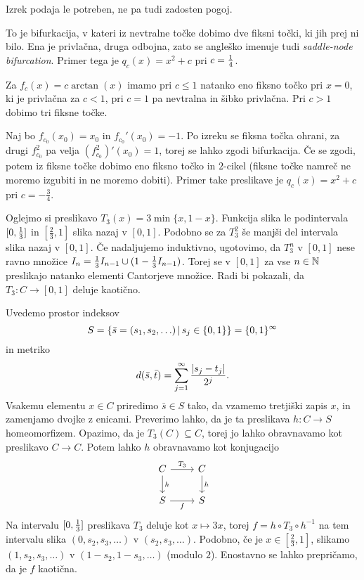 \begin{opomba}
  Izrek podaja le potreben, ne pa tudi zadosten pogoj.
\end{opomba}

\begin{primer}
  To je bifurkacija, v kateri iz nevtralne točke dobimo dve fiksni točki, ki jih
  prej ni bilo.
  Ena je privlačna, druga odbojna, zato se angleško imenuje tudi
  \textit{saddle-node bifurcation}.
  Primer tega je $q_c(x) = x^2 + c$ pri $c = \frac{1}{4}$.
\end{primer}

\begin{primer}
  Za $f_c(x) = c \arctan(x)$ imamo pri $c \le 1$ natanko eno fiksno točko pri $x
  = 0$, ki je privlačna za $c < 1$, pri $c = 1$ pa nevtralna in šibko privlačna.
  Pri $c > 1$ dobimo tri fiksne točke.
\end{primer}

\begin{primer}
  Naj bo $f_{c_0}(x_0) = x_0$ in $f_{c_0}'(x_0) = -1$.
  Po izreku se fiksna točka ohrani, za drugi $f_{c_0}^2$ pa velja
  $(f_{c_0}^2)'(x_0) = 1$, torej se lahko zgodi bifurkacija.
  Če se zgodi, potem iz fiksne točke dobimo eno fiksno točko in $2$-cikel
  (fiksne točke namreč ne moremo izgubiti in ne moremo dobiti).
  Primer take preslikave je $q_c(x) = x^2 + c$ pri $c = -\frac{3}{4}$.
\end{primer}


Oglejmo si preslikavo $T_3(x) = 3 \min \{x, 1-x\}$.
Funkcija slika le podintervala $[0, \frac{1}{3}]$ in $[\frac{2}{3}, 1]$ slika nazaj
v $[0,1]$.
Podobno se za $T_3^2$ še manjši del intervala slika nazaj v $[0,1]$.
Če nadaljujemo induktivno, ugotovimo, da $T_3^n$ v $[0,1]$ nese ravno množice
$I_n = \frac{1}{3} I_{n-1} \cup (1 - \frac{1}{3} I_{n-1})$.
Torej se v $[0,1]$ za vse $n \in \mathbb{N}$ preslikajo natanko elementi Cantorjeve
množice.
Radi bi pokazali, da $T_3: C \to [0,1]$ deluje kaotično.

Uvedemo prostor indeksov
\[
  S = \{ \bar{s} = (s_1, s_2, \ldots) \,|\, s_j \in \{0,1\} \} = \{0,1\}^\infty
\]
in metriko
\[
  d(\bar{s}, \bar{t}) = \sum_{j=1}^\infty \frac{\left| s_j - t_j \right|}{2^j}.
\]
Vsakemu elementu $x \in C$ priredimo $\bar{s} \in S$ tako, da vzamemo tretjiški
zapis $x$, in zamenjamo dvojke z enicami.
Preverimo lahko, da je ta preslikava $h: C \to S$ homeomorfizem.
Opazimo, da je $T_3(C) \subseteq C$, torej jo lahko obravnavamo kot preslikavo
$C \to C$.
Potem lahko $h$ obravnavamo kot konjugacijo
\[\begin{tikzcd}
	C & C \\
	S & S
	\arrow["{T_3}", from=1-1, to=1-2]
	\arrow["h", from=1-1, to=2-1]
	\arrow["h", from=1-2, to=2-2]
	\arrow["f"', from=2-1, to=2-2]
  \end{tikzcd}\]
Na intervalu $[0,\frac{1}{3}]$ preslikava $T_3$ deluje kot $x \mapsto 3x$, torej
$f = h \circ T_3 \circ h^{-1}$ na tem intervalu slika $(0, s_2, s_3, \ldots)$ v
$(s_2, s_3, \ldots)$.
Podobno, če je $x \in [\frac{2}{3}, 1]$, slikamo $(1, s_2, s_3, \ldots)$ v
$(1 - s_2, 1 - s_3, \ldots)$ (modulo $2$).
Enostavno se lahko prepričamo, da je $f$ kaotična.

